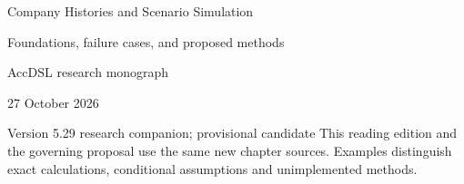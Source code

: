 \documentclass[11pt,a4paper]{report}
\begin{document}
\hypersetup{pageanchor=false}
\begin{titlepage}
{\Huge Company Histories and Scenario Simulation\par}
\vspace{12mm}
{\Large Foundations, failure cases, and proposed methods\par}
\vspace{8mm}
AccDSL research monograph\par 27 October 2026\par Version 5.29 research companion; provisional candidate
\vfill
This reading edition and the governing proposal use the same new chapter sources. Examples distinguish exact calculations, conditional assumptions and unimplemented methods.
\end{titlepage}
\hypersetup{pageanchor=true}
\tableofcontents
\clearpage{}


























\clearpage\label{sim:body-end}

\begingroup\raggedright
\endgroup
\end{document}
